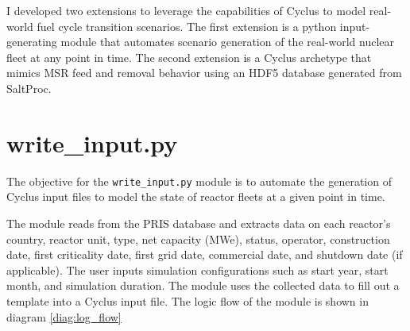 I developed two extensions to leverage 
the capabilities of Cyclus to model
real-world fuel cycle transition scenarios.
The first extension is a python input-generating module
that automates scenario generation of the real-world 
nuclear fleet at any point in time. The second extension
is a Cyclus archetype that mimics \gls{MSR} feed and removal
behavior using an HDF5 database generated from SaltProc.

\section{write\_input.py}
\label{sec:writeinput}
The objective for the \texttt{write\_input.py} module
is to automate the generation of Cyclus input files
to model the state of reactor fleets at a given
point in time.

The module reads from the \gls{PRIS} database \cite{iaea_nuclear_2018}
and extracts data on each reactor's country, reactor unit,
type, net capacity (MWe), status, operator, construction date,
first criticality date, first grid date, commercial date,
and shutdown date (if applicable). The user inputs simulation
configurations such as start year, start month, and
simulation duration. The module uses the collected data to
fill out a template into a Cyclus input file. The logic flow of the module is 
shown in diagram \ref{diag:log_flow}


